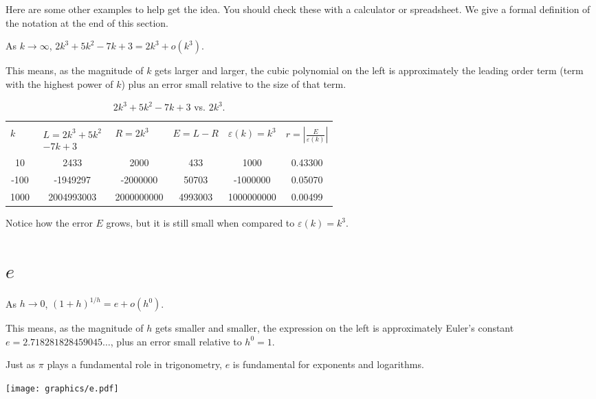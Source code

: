 Here are some other examples to help get the idea.  You should check these with a calculator or spreadsheet.  We give a formal definition of the notation at the end of this section. 
 
As  $k \rightarrow \infty$,  $2k^3 + 5 k^2 - 7 k + 3 = 2k^3 + o (k^3 )$.     
 
This means, as the magnitude of  $k$ gets larger and larger, the cubic polynomial on the left is approximately the leading order term (term with the highest power of  $k$) plus an error small relative to the size of that term.   

\begin{table}
\caption{$2k^3 + 5 k^2 - 7 k + 3$ vs. $2k^3$.}
\label{tab:basic2}
\begin{tabular}{|S[table-format=4]|S[table-format=10]|S[table-format=10]|S[table-format=7]|S[table-format=10]|S[table-format=1.5]|}
 \\
 & 
 & 
 & 
 &
 &
 \\
  & 2433 & 2000 & 433 & 1000 & 0.43300 \\
-100 & -1949297 &  -2000000 & 50703 & -1000000 & 0.05070 \\
1000 & 2004993003 & 2000000000 & 4993003 & 1000000000 & 0.00499 \\
\hline
\end{tabular}
\end{table}

Notice how the error $E$ grows, but it is still small when compared to $\varepsilon(k) = k^3$.  

\section{$e$}
As $h \rightarrow 0$, $(1 + h)^{1/h}=e+o(h^0)$.

This means, as the magnitude of  $h$ gets smaller and smaller, the expression on the left is  
approximately Euler's constant $e = \num{2.718281828459045}\ldots$, plus an error small relative to $h^0=1$.

Just as  $\pi$ plays a fundamental role in trigonometry, $e$ is fundamental for exponents and  
logarithms. 
\begin{marginfigure}
\texttt{[image: graphics/e.pdf]}
\caption{$(1 + h )^{1/h}=e+o(h^0)$.}
\label{fig:basics1}
\end{marginfigure}
 

